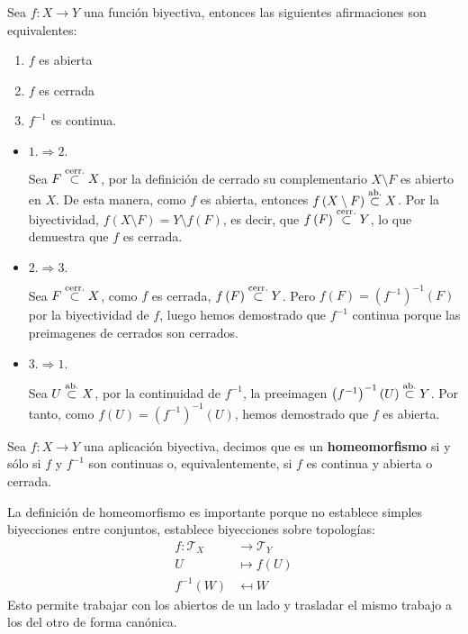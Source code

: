 \begin{prop}
Sea $f:X\rightarrow Y$ una función biyectiva, entonces las siguientes afirmaciones son equivalentes:
\begin{enumerate}
    \item $f$ es abierta
    \item $f$ es cerrada
    \item $f^{-1}$ es continua.
\end{enumerate}
\end{prop}
\begin{demo}
\begin{itemize}
    \item $1. \Rightarrow 2.$
    
    Sea $F \stackrel{\text{cerr.}}{\subset} X$, por la definición de cerrado su complementario $X\setminus F$ es abierto en $X$. De esta manera, como $f$ es abierta, entonces $f\left( X\setminus F \right) \stackrel{\text{ab.}}{\subset} X$. Por la biyectividad, $f\left( X\setminus F \right) = Y\setminus f\left( F \right)$, es decir, que $f\left( F \right) \stackrel{\text{cerr.}}{\subset} Y$, lo que demuestra que $f$ es cerrada.

    \item $2. \Rightarrow 3.$
    
    Sea $F \stackrel{\text{cerr.}}{\subset} X$, como $f$ es cerrada, $f\left( F \right) \stackrel{\text{cerr.}}{\subset} Y$. Pero $f(F)= \left( f^{-1} \right)^{-1} \left( F \right)$ por la biyectividad de $f$, luego hemos demostrado que $f^{-1}$ continua porque las preimagenes de cerrados son cerrados.

    \item $3. \Rightarrow 1.$
    
    Sea $U \stackrel{\text{ab.}}{\subset} X$, por la continuidad de $f^{-1}$, la preeimagen $\left( f^{-1} \right)^{-1} \left( U \right) \stackrel{\text{ab.}}{\subset} Y$. Por tanto, como $f\left( U \right) =  \left( f^{-1} \right)^{-1} \left( U \right)$, hemos demostrado que $f$ es abierta.
\end{itemize}
\end{demo}

\begin{defi}[Homeomorfismo]
Sea $f: X \rightarrow Y$ una aplicación biyectiva, decimos que es un \textbf{homeomorfismo} si y sólo si $f$ y $f^{-1}$ son continuas o, equivalentemente, si $f$ es continua y abierta o cerrada.
\end{defi}

\begin{obs}
La definición de homeomorfismo es importante porque no establece simples biyecciones entre conjuntos, establece biyecciones sobre topologías:
\begin{align*}
	f: \mathcal{T}_X &\rightarrow \mathcal{T}_Y\\
	U &\mapsto f\left( U \right)\\
	f^{-1}\left( W \right) &\mapsfrom W 
\end{align*}
Esto permite trabajar con los abiertos de un lado y trasladar el mismo trabajo a los del otro de forma canónica.
\end{obs}

